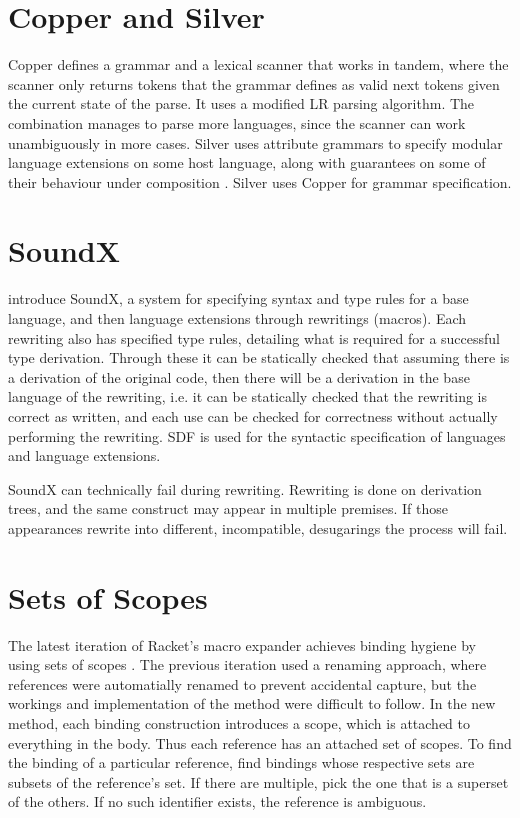 \documentclass{kththesis}
\begin{document}
\section{Copper and Silver}

Copper \cite{VanWyk2007} defines a grammar and a lexical scanner that works in tandem, where the scanner only returns tokens that the grammar defines as valid next tokens given the current state of the parse. It uses a modified LR parsing algorithm. The combination manages to parse more languages, since the scanner can work unambiguously in more cases. Silver \cite{VanWyk2010} uses attribute grammars to specify modular language extensions on some host language, along with guarantees on some of their behaviour under composition \cite{Kaminski2017}. Silver uses Copper for grammar specification.

\section{SoundX}

\textcite{Lorenzen2016} introduce SoundX, a system for specifying syntax and type rules for a base language, and then language extensions through rewritings (macros). Each rewriting also has specified type rules, detailing what is required for a successful type derivation. Through these it can be statically checked that assuming there is a derivation of the original code, then there will be a derivation in the base language of the rewriting, i.e. it can be statically checked that the rewriting is correct as written, and each use can be checked for correctness without actually performing the rewriting. SDF is used for the syntactic specification of languages and language extensions.

SoundX can technically fail during rewriting. Rewriting is done on derivation trees, and the same construct may appear in multiple premises. If those appearances rewrite into different, incompatible, desugarings the process will fail.

\section{Sets of Scopes}

The latest iteration of Racket's \cite{plt-tr1} macro expander achieves binding hygiene by using sets of scopes \cite{Flatt:2016:BSS:2837614.2837620}. The previous iteration used a renaming approach, where references were automatially renamed to prevent accidental capture, but the workings and implementation of the method were difficult to follow. In the new method, each binding construction introduces a scope, which is attached to everything in the body. Thus each reference has an attached set of scopes. To find the binding of a particular reference, find bindings whose respective sets are subsets of the reference's set. If there are multiple, pick the one that is a superset of the others. If no such identifier exists, the reference is ambiguous.
\end{document}
